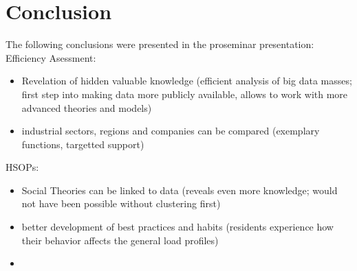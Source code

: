 \chapter{Conclusion}
\label{cha:conclusion}






The following conclusions were presented in the proseminar presentation:
Efficiency Asessment:
\begin{itemize}
    \item Revelation of hidden valuable knowledge (efficient analysis of big data masses; first step into making data more publicly available, allows to work with more advanced theories and models)
    \item industrial sectors, regions and companies can be compared (exemplary functions, targetted support)
\end{itemize}

HSOPs:
\begin{itemize}
    \item Social Theories can be linked to data (reveals even more knowledge; would not have been possible without clustering first)
    \item better development of best practices and habits (residents experience how their behavior affects the general load profiles)
    \item 
\end{itemize}
